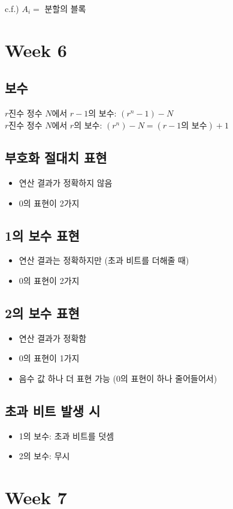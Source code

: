 c.f.) $A_i = $ 분할의 블록

\section{Week 6}
\subsection{보수}
$r$진수 정수 $N$에서 $r-1$의 보수: $(r^n-1) - N$\\
$r$진수 정수 $N$에서 $r$의 보수: $(r^n) - N = (r-1\text{의 보수}) + 1$

\subsection{부호화 절대치 표현}
\begin{itemize}
    \item 연산 결과가 정확하지 않음
    \item 0의 표현이 2가지
\end{itemize}
\subsection{1의 보수 표현}
\begin{itemize}
    \item 연산 결과는 정확하지만 (초과 비트를 더해줄 때)
    \item 0의 표현이 2가지
\end{itemize}
\subsection{2의 보수 표현}
\begin{itemize}
    \item 연산 결과가 정확함
    \item 0의 표현이 1가지
    \item 음수 값 하나 더 표현 가능 (0의 표현이 하나 줄어들어서)
\end{itemize}
\subsection{초과 비트 발생 시}
\begin{itemize}
    \item 1의 보수: 초과 비트를 덧셈
    \item 2의 보수: 무시
\end{itemize}

\newpage
\section{Week 7}
